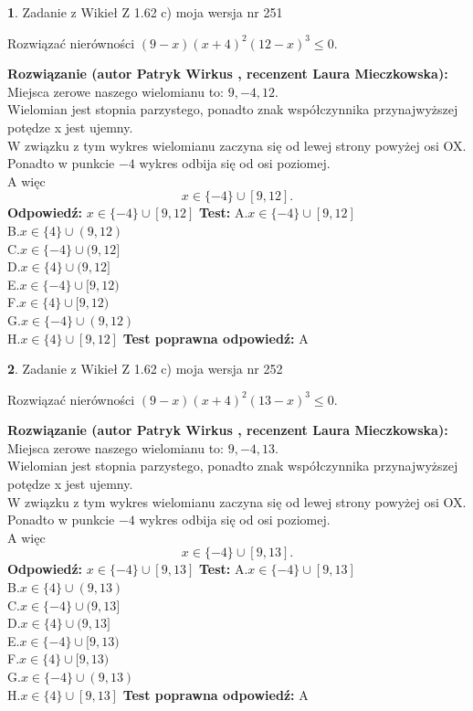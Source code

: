 \documentclass[12pt, a4paper]{article}
\theoremstyle{definition} %
\newtheorem{zad}{}
\newcommand{\zadStart}[1]{\begin{zad}#1\newline}
\newcommand{\zadStop}{\end{zad}}
\newcommand{\rozwStart}[2]{\noindent \textbf{Rozwiązanie (autor #1 , recenzent #2): }\newline}
\newcommand{\rozwStop}{\newline}
\newcommand{\odpStart}{\noindent \textbf{Odpowiedź:}\newline}
\newcommand{\odpStop}{\newline}
\newcommand{\testStart}{\noindent \textbf{Test:}\newline}
\newcommand{\testStop}{\newline}
\newcommand{\kluczStart}{\noindent \textbf{Test poprawna odpowiedź:}\newline}
\newcommand{\kluczStop}{\newline}
\begin{document}
\zadStart{Zadanie z Wikieł Z 1.62 c) moja wersja nr 251}

Rozwiązać nierówności $(9-x)(x+4)^{2}(12-x)^{3}\le0$.
\zadStop
\rozwStart{Patryk Wirkus}{Laura Mieczkowska}
Miejsca zerowe naszego wielomianu to: $9, -4, 12$.\\
Wielomian jest stopnia parzystego, ponadto znak współczynnika przy\linebreak najwyższej potędze x jest ujemny.\\ W związku z tym wykres wielomianu zaczyna się od lewej strony powyżej osi OX.\\
Ponadto w punkcie $-4$ wykres odbija się od osi poziomej.\\
A więc $$x \in \{-4\} \cup [9,12].$$
\rozwStop
\odpStart
$x \in \{-4\} \cup [9,12]$
\odpStop
\testStart
A.$x \in \{-4\} \cup [9,12]$\\
B.$x \in \{4\} \cup (9,12)$\\
C.$x \in \{-4\} \cup (9,12]$\\
D.$x \in \{4\} \cup (9,12]$\\
E.$x \in \{-4\} \cup [9,12)$\\
F.$x \in \{4\} \cup [9,12)$\\
G.$x \in \{-4\} \cup (9,12)$\\
H.$x \in \{4\} \cup [9,12]$
\testStop
\kluczStart
A
\kluczStop



\zadStart{Zadanie z Wikieł Z 1.62 c) moja wersja nr 252}

Rozwiązać nierówności $(9-x)(x+4)^{2}(13-x)^{3}\le0$.
\zadStop
\rozwStart{Patryk Wirkus}{Laura Mieczkowska}
Miejsca zerowe naszego wielomianu to: $9, -4, 13$.\\
Wielomian jest stopnia parzystego, ponadto znak współczynnika przy\linebreak najwyższej potędze x jest ujemny.\\ W związku z tym wykres wielomianu zaczyna się od lewej strony powyżej osi OX.\\
Ponadto w punkcie $-4$ wykres odbija się od osi poziomej.\\
A więc $$x \in \{-4\} \cup [9,13].$$
\rozwStop
\odpStart
$x \in \{-4\} \cup [9,13]$
\odpStop
\testStart
A.$x \in \{-4\} \cup [9,13]$\\
B.$x \in \{4\} \cup (9,13)$\\
C.$x \in \{-4\} \cup (9,13]$\\
D.$x \in \{4\} \cup (9,13]$\\
E.$x \in \{-4\} \cup [9,13)$\\
F.$x \in \{4\} \cup [9,13)$\\
G.$x \in \{-4\} \cup (9,13)$\\
H.$x \in \{4\} \cup [9,13]$
\testStop
\kluczStart
A
\kluczStop
\end{document}
